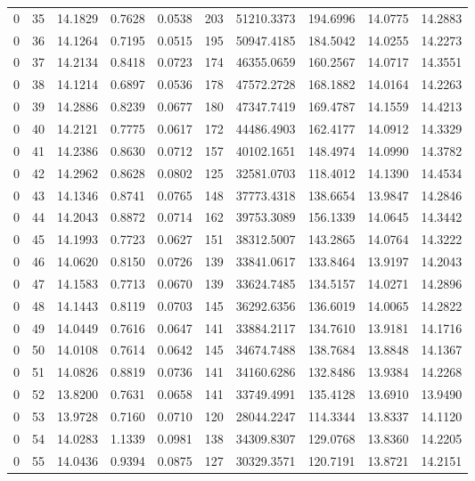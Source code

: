 \begin{longtable}{rrrrrrrrrr}
0 & 35 & 14.1829 & 0.7628 & 0.0538 & 203 & 51210.3373 & 194.6996 & 14.0775 & 14.2883 \\
0 & 36 & 14.1264 & 0.7195 & 0.0515 & 195 & 50947.4185 & 184.5042 & 14.0255 & 14.2273 \\
0 & 37 & 14.2134 & 0.8418 & 0.0723 & 174 & 46355.0659 & 160.2567 & 14.0717 & 14.3551 \\
0 & 38 & 14.1214 & 0.6897 & 0.0536 & 178 & 47572.2728 & 168.1882 & 14.0164 & 14.2263 \\
0 & 39 & 14.2886 & 0.8239 & 0.0677 & 180 & 47347.7419 & 169.4787 & 14.1559 & 14.4213 \\
0 & 40 & 14.2121 & 0.7775 & 0.0617 & 172 & 44486.4903 & 162.4177 & 14.0912 & 14.3329 \\
0 & 41 & 14.2386 & 0.8630 & 0.0712 & 157 & 40102.1651 & 148.4974 & 14.0990 & 14.3782 \\
0 & 42 & 14.2962 & 0.8628 & 0.0802 & 125 & 32581.0703 & 118.4012 & 14.1390 & 14.4534 \\
0 & 43 & 14.1346 & 0.8741 & 0.0765 & 148 & 37773.4318 & 138.6654 & 13.9847 & 14.2846 \\
0 & 44 & 14.2043 & 0.8872 & 0.0714 & 162 & 39753.3089 & 156.1339 & 14.0645 & 14.3442 \\
0 & 45 & 14.1993 & 0.7723 & 0.0627 & 151 & 38312.5007 & 143.2865 & 14.0764 & 14.3222 \\
0 & 46 & 14.0620 & 0.8150 & 0.0726 & 139 & 33841.0617 & 133.8464 & 13.9197 & 14.2043 \\
0 & 47 & 14.1583 & 0.7713 & 0.0670 & 139 & 33624.7485 & 134.5157 & 14.0271 & 14.2896 \\
0 & 48 & 14.1443 & 0.8119 & 0.0703 & 145 & 36292.6356 & 136.6019 & 14.0065 & 14.2822 \\
0 & 49 & 14.0449 & 0.7616 & 0.0647 & 141 & 33884.2117 & 134.7610 & 13.9181 & 14.1716 \\
0 & 50 & 14.0108 & 0.7614 & 0.0642 & 145 & 34674.7488 & 138.7684 & 13.8848 & 14.1367 \\
0 & 51 & 14.0826 & 0.8819 & 0.0736 & 141 & 34160.6286 & 132.8486 & 13.9384 & 14.2268 \\
0 & 52 & 13.8200 & 0.7631 & 0.0658 & 141 & 33749.4991 & 135.4128 & 13.6910 & 13.9490 \\
0 & 53 & 13.9728 & 0.7160 & 0.0710 & 120 & 28044.2247 & 114.3344 & 13.8337 & 14.1120 \\
0 & 54 & 14.0283 & 1.1339 & 0.0981 & 138 & 34309.8307 & 129.0768 & 13.8360 & 14.2205 \\
0 & 55 & 14.0436 & 0.9394 & 0.0875 & 127 & 30329.3571 & 120.7191 & 13.8721 & 14.2151 \\

\end{longtable}
